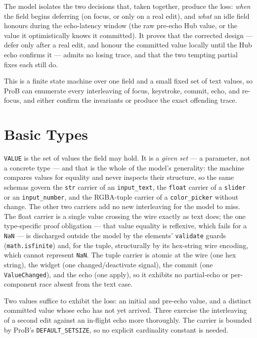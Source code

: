 \documentclass[a4paper,10pt,fleqn]{article}
\begin{document}
The model isolates the two decisions that, taken together, produce the loss:
\emph{when} the field begins deferring (on focus, or only on a real edit), and
\emph{what} an idle field honours during the echo-latency window (the raw
pre-echo Hub value, or the value it optimistically knows it committed).  It
proves that the corrected design --- defer only after a real edit, and honour
the committed value locally until the Hub echo confirms it --- admits no losing
trace, and that the two tempting partial fixes each still do.

This is a finite state machine over one field and a small fixed set of text
values, so ProB can enumerate every interleaving of focus, keystroke, commit,
echo, and re-focus, and either confirm the invariants or produce the exact
offending trace.

\section{Basic Types}

\begin{zed}
  [VALUE]
\end{zed}

\texttt{VALUE} is the set of values the field may hold.  It is a \emph{given
set} --- a parameter, not a concrete type --- and that is the whole of the
model's generality: the machine compares values for equality and never inspects
their structure, so the same schemas govern the \texttt{str} carrier of an
\texttt{input\_text}, the \texttt{float} carrier of a \texttt{slider} or an
\texttt{input\_number}, and the RGBA-tuple carrier of a \texttt{color\_picker}
without change.  The other two carriers add no new interleaving for the model to
miss.  The float carrier is a single value crossing the wire exactly as text
does; the one type-specific proof obligation --- that value equality is
reflexive, which fails for a \texttt{NaN} --- is discharged outside the model by
the elements' \texttt{validate} guards (\texttt{math.isfinite}) and, for the
tuple, structurally by its hex-string wire encoding, which cannot represent
\texttt{NaN}.  The tuple carrier is atomic at the wire (one hex string), the
widget (one changed/deactivate signal), the commit (one \texttt{ValueChanged}),
and the echo (one apply), so it exhibits no partial-echo or per-component race
absent from the text case.

Two values suffice to exhibit the loss: an initial and pre-echo value, and a
distinct committed value whose echo has not yet arrived.  Three exercise the
interleaving of a second edit against an in-flight echo more thoroughly.  The
carrier is bounded by ProB's \texttt{DEFAULT\_SETSIZE}, so no explicit
cardinality constant is needed.
\end{document}
